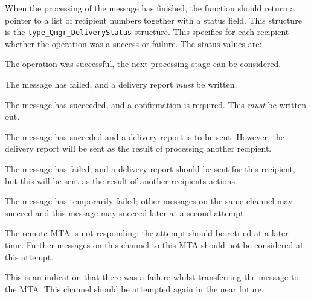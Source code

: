 When the processing of the message has finished, the function should
return a pointer to a list of recipient numbers together with a status
field. This structure is the \verb|type_Qmgr_DeliveryStatus|
structure. This specifies for each recipient whether the operation was
a success or failure. The status values are:
\begin{describe}
\item[\verb|int\_Qmgr\_status\_success|:]
The operation was successful, the next processing stage can be
considered.

\item[\verb|int\_Qmgr\_status\_negativeDR|:]
The message has failed, and a delivery report {\em must} be written.

\item[\verb|int\_Qmgr\_status\_positiveDR|:]
The message has succeeded, and a confirmation is required. This {\em
must} be written out.

\item[\verb|int\_Qmgr\_status\_successSharedDR|:]
The message has suceeded and a delivery report is to be sent. However,
the delivery report will be sent as the result of processing another
recipient.

\item[\verb|int\_Qmgr\_status\_failureSharedDR|:]
The message has failed, and a delivery report should be sent for
this recipient, but this will be sent as the result of another
recipients actions.

\item[\verb|int\_Qmgr\_status\_messageFailure|:]
The message has temporarily failed; other messages on the same channel
may succeed and this message may succeed later at a second attempt.

\item[\verb|int\_Qmgr\_status\_mtaFailure|:]
The remote MTA is not responding: the attempt should be retried at a
later time. Further messages on this channel to this MTA should not be
considered at this attempt.

\item[\verb|int\_Qmgr\_status\_mtaAndMessageFailure|:]
This is an indication that there was a failure whilst transferring  the
message to the MTA. This channel should be attempted again in the near
future.
\end{describe}

